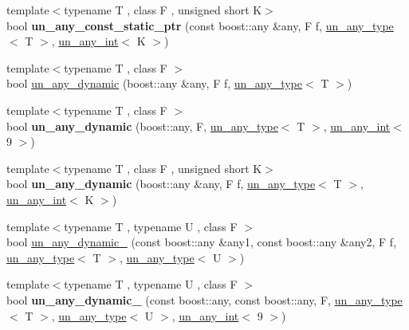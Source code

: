 \begin{DoxyCompactItemize}
\item 
{\footnotesize template$<$typename T , class F , unsigned short K$>$ }\\bool {\bfseries un\+\_\+any\+\_\+const\+\_\+static\+\_\+ptr} (const boost\+::any \&any, F f, \mbox{\hyperlink{struct_s_m_spp__di__unipi__it_1_1un__any__type}{un\+\_\+any\+\_\+type}}$<$ T $>$, \mbox{\hyperlink{struct_s_m_spp__di__unipi__it_1_1un__any__int}{un\+\_\+any\+\_\+int}}$<$ K $>$)
\item 
{\footnotesize template$<$typename T , class F $>$ }\\bool \mbox{\hyperlink{group__boost__any__stuff_gaf12786a4337938023337a397d0077949}{un\+\_\+any\+\_\+dynamic}} (boost\+::any \&any, F f, \mbox{\hyperlink{struct_s_m_spp__di__unipi__it_1_1un__any__type}{un\+\_\+any\+\_\+type}}$<$ T $>$)
\item 
{\footnotesize template$<$typename T , class F $>$ }\\bool {\bfseries un\+\_\+any\+\_\+dynamic} (boost\+::any, F, \mbox{\hyperlink{struct_s_m_spp__di__unipi__it_1_1un__any__type}{un\+\_\+any\+\_\+type}}$<$ T $>$, \mbox{\hyperlink{struct_s_m_spp__di__unipi__it_1_1un__any__int}{un\+\_\+any\+\_\+int}}$<$ 9 $>$)
\item 
{\footnotesize template$<$typename T , class F , unsigned short K$>$ }\\bool {\bfseries un\+\_\+any\+\_\+dynamic} (boost\+::any \&any, F f, \mbox{\hyperlink{struct_s_m_spp__di__unipi__it_1_1un__any__type}{un\+\_\+any\+\_\+type}}$<$ T $>$, \mbox{\hyperlink{struct_s_m_spp__di__unipi__it_1_1un__any__int}{un\+\_\+any\+\_\+int}}$<$ K $>$)
\item 
{\footnotesize template$<$typename T , typename U , class F $>$ }\\bool \mbox{\hyperlink{group__boost__any__stuff_gadaf95dbdadd3727f00ee8f2bcdbf29cf}{un\+\_\+any\+\_\+dynamic\+\_}} (const boost\+::any \&any1, const boost\+::any \&any2, F f, \mbox{\hyperlink{struct_s_m_spp__di__unipi__it_1_1un__any__type}{un\+\_\+any\+\_\+type}}$<$ T $>$, \mbox{\hyperlink{struct_s_m_spp__di__unipi__it_1_1un__any__type}{un\+\_\+any\+\_\+type}}$<$ U $>$)
\item 
{\footnotesize template$<$typename T , typename U , class F $>$ }\\bool {\bfseries un\+\_\+any\+\_\+dynamic\+\_} (const boost\+::any, const boost\+::any, F, \mbox{\hyperlink{struct_s_m_spp__di__unipi__it_1_1un__any__type}{un\+\_\+any\+\_\+type}}$<$ T $>$, \mbox{\hyperlink{struct_s_m_spp__di__unipi__it_1_1un__any__type}{un\+\_\+any\+\_\+type}}$<$ U $>$, \mbox{\hyperlink{struct_s_m_spp__di__unipi__it_1_1un__any__int}{un\+\_\+any\+\_\+int}}$<$ 9 $>$)

\end{DoxyCompactItemize}
